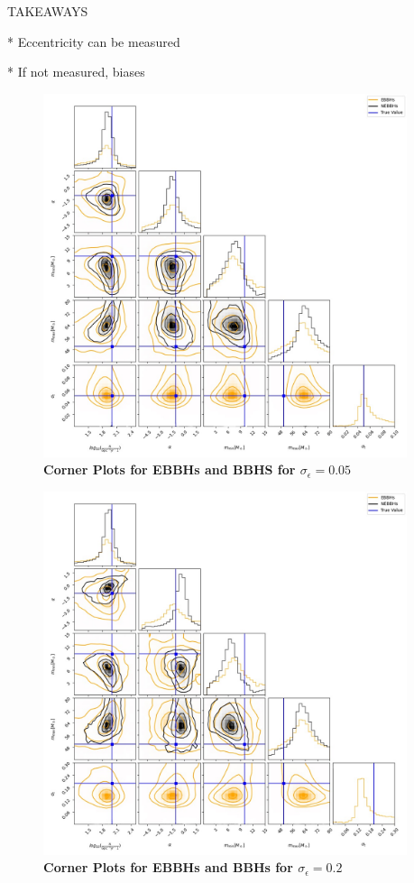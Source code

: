 \documentclass[twocolumn,prd,nofootinbib]{revtex4}
\begin{document}
TAKEAWAYS

* Eccentricity can be measured

* If not measured, biases




\begin{figure}

\includegraphics[width=0.95\textwidth]{paper/figures/cor_0.05.png}
\caption{\label{fig:pop3d05}\textbf{Corner Plots for EBBHs and BBHS for $\sigma_\epsilon=0.05$}}

\end{figure}

\begin{figure}

\includegraphics[width=0.95\textwidth]{paper/figures/cor_0.2.png}
\caption{\label{fig:pop3d05}\textbf{Corner Plots for EBBHs and BBHs for $\sigma_\epsilon=0.2$}}

\end{figure} 
\end{document}
